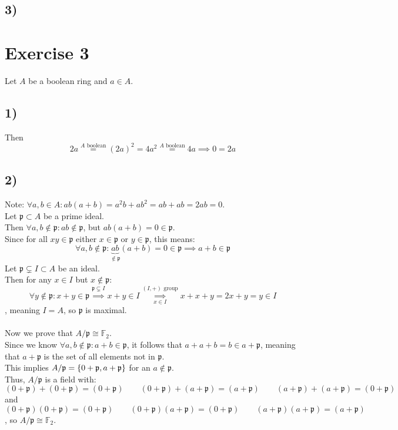 \documentclass[a4paper]{scrartcl}
\begin{document}
\subsection*{3)}



























\section*{Exercise 3}
Let $A$ be a boolean ring and $a\in A$.
\subsection*{1)}
Then
\[2a\overset{A\text{ boolean}}{=}(2a)^2=4a^2\overset{A\text{ boolean}}{=}4a\implies0=2a\]
\subsection*{2)}
Note: $\forall a,b\in A: ab(a+b)=a^2b+ab^2=ab+ab=2ab=0$.\\
Let $\mathfrak{p}\subset A$ be a prime ideal.\\
Then $\forall a,b\not\in\mathfrak{p}:ab\not\in\mathfrak{p}$, but $ab(a+b)=0\in\mathfrak{p}$.\\
Since for all $xy\in\mathfrak{p}$ either $x\in\mathfrak{p}$ or $y\in\mathfrak{p}$, this means:
\[\forall a,b\not\in\mathfrak{p}:\underbrace{ab}_{\not\in\mathfrak{p}}(a+b)=0\in\mathfrak{p}\implies a+b\in\mathfrak{p}\]
Let $\mathfrak{p}\subsetneq I\subset A$ be an ideal.\\
Then for any $x\in I$ but $x\not\in\mathfrak{p}$:
\[\forall y\not\in\mathfrak{p}:x+y\in\mathfrak{p}\overset{\mathfrak{p}\subsetneq I}{\implies}x+y\in I\overset{(I,+)\text{ group}}{\underset{x\in I}{\implies}}x+x+y=2x+y=y\in I\]
, meaning $I=A$, so $\mathfrak{p}$ is maximal.\\ \\
Now we prove that $A/\mathfrak{p}\cong\mathbb{F}_2$.\\
Since we know $\forall a,b\not\in\mathfrak{p}:a+b\in\mathfrak{p}$, it follows that $a+a+b=b\in a+\mathfrak{p}$, meaning that $a+\mathfrak{p}$ is the set of all elements not in $\mathfrak{p}$.\\
This implies $A/\mathfrak{p}=\left\lbrace 0+\mathfrak{p},a+\mathfrak{p} \right\rbrace$ for an $a\not\in\mathfrak{p}$.\\
Thus, $A/\mathfrak{p}$ is a field with:
\[(0+\mathfrak{p})+(0+\mathfrak{p})=(0+\mathfrak{p})\qquad(0+\mathfrak{p})+(a+\mathfrak{p})=(a+\mathfrak{p})\qquad(a+\mathfrak{p})+(a+\mathfrak{p})=(0+\mathfrak{p})\]
and
\[(0+\mathfrak{p})(0+\mathfrak{p})=(0+\mathfrak{p})\qquad(0+\mathfrak{p})(a+\mathfrak{p})=(0+\mathfrak{p})\qquad(a+\mathfrak{p})(a+\mathfrak{p})=(a+\mathfrak{p})\]
, so $A/\mathfrak{p}\cong\mathbb{F}_2$.
\end{document}
